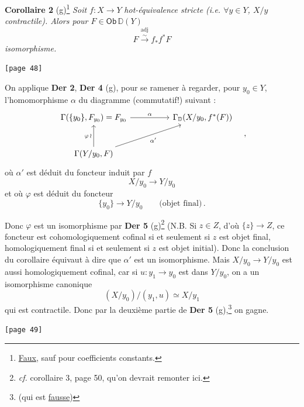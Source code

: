 \documentclass[11pt]{article}
\newcommand{\printedpage}[1]{\marginpar{\footnotesize p.~#1}}
\newcommand{\msp}[1]{\marginpar{\footnotesize [#1]}}
\newcommand{\Ob}{\mathsf{Ob}}
\newcommand{\D}{\mathbb{D}}
\begin{document}
\noindent\textbf{Corollaire 2} (g)\footnote[16]{\underline{Faux}, sauf pour coefficients constants.} \textit{Soit $f : X \to Y$} \textit{hot-équivalence stricte (i.e. $\forall y \in Y$, $X/y$ contractile). Alors pour $F \in \Ob\,\D(Y)$}
\[ F \overset{\text{adj}}{\xrightarrow{\sim}} f_{*} f^{*} F \]
 \textit{isomorphisme.}

\noindent\msp{page 48}\texttt{[page 48]}

\noindent On applique \textbf{Der 2}, \textbf{Der 4} (g), pour se ramener à regarder, pour $y_{0} \in Y$, l'homomorphisme $\alpha$ du diagramme (commutatif!) suivant :
\[
\begin{tikzcd}[row sep=large, column sep=huge]
\Gamma(\{y_{0}\}, F_{y_{0}}) = F_{y_{0}} \arrow[r, "\alpha"] & \Gamma_{\D}(X/y_{0}, f^{*}(F)) \\
\Gamma(Y/y_{0}, F) \arrow[u, "\varphi\,\wr"] \arrow[ur, "\alpha'"'] &
\end{tikzcd}
\quad ,
\]
où $\alpha'$ est déduit du foncteur induit par $f$
\[ X/y_{0} \longrightarrow Y/y_{0} \]
et où $\varphi$ est déduit du foncteur
\[ \{y_{0}\} \longrightarrow Y/y_{0} \qquad \text{(objet final)}\,. \]


\printedpage{27}

\noindent Donc $\varphi$ est un isomorphisme par \textbf{Der 5} (g)\footnote[17]{\textit{cf.} corollaire 3, page 50, qu'on devrait remonter ici.} (N.B. Si $z \in Z$, d'où $\{z\} \to Z$, ce foncteur est cohomologiquement cofinal si et seulement si $z$ est objet final, homologiquement final si et seulement si $z$ est objet initial). Donc la conclusion du corollaire équivaut à dire que $\alpha'$ est un isomorphisme. Mais $X/y_{0} \to Y/y_{0}$ est aussi homologiquement cofinal, car si $u : y_{1} \to y_{0}$ est dans $Y/y_{0}$, on a un isomorphisme canonique
\[ (X/y_{0})/(y_{1}, u) \simeq X/y_{1} \]
qui est contractile. Donc par la deuxième partie de \textbf{Der 5} (g),\footnote[18]{(qui est \underline{fausse})} on gagne.

\noindent\msp{page 49}\texttt{[page 49]}
\end{document}
